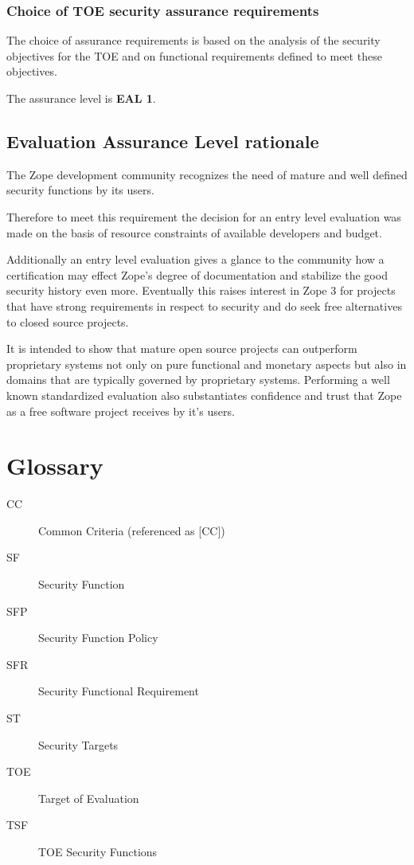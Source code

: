 \documentclass[12pt,english]{scrbook}
\begin{document}

\subsection{Choice of TOE security assurance requirements}

The choice of assurance requirements is based on the analysis of the security
objectives for the TOE and on functional requirements defined to meet these
objectives.

The assurance level is \textbf{EAL 1}.



\section{Evaluation Assurance Level rationale}

The Zope development community recognizes the need of mature and well defined
security functions by its users.

Therefore to meet this requirement the decision for an entry level evaluation
was made on the basis of resource constraints of available developers and
budget.

Additionally an entry level evaluation gives a glance to the community how a
certification may effect Zope's degree of documentation and stabilize the good
security history even more. Eventually this raises interest in Zope 3 for
projects that have strong requirements in respect to security and do seek free
alternatives to closed source projects.

It is intended to show that mature open source projects can outperform
proprietary systems not only on pure functional and monetary aspects but also
in domains that are typically governed by proprietary systems. Performing a
well known standardized evaluation also substantiates confidence and trust that
Zope as a free software project receives by it's users.




\chapter{Glossary}

\begin{description}

  \item[CC] Common Criteria (referenced as {[}CC])
  \item[SF] Security Function
  \item[SFP] Security Function Policy
  \item[SFR] Security Functional Requirement
  \item[ST] Security Targets
  \item[TOE] Target of Evaluation
  \item[TSF] TOE Security Functions

\end{description} 
\end{document}
